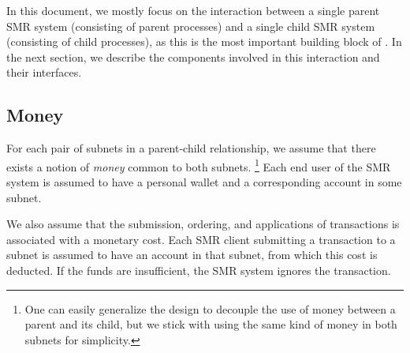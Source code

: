 In this document, we mostly focus on the interaction between a single parent SMR system (consisting of parent processes) and a single child SMR system (consisting of child processes), as this is the most important building block of \ipc.
In the next section, we describe the components involved in this interaction and their interfaces.

\subsection{Money}

For each pair of subnets in a parent-child relationship, we assume that there exists a notion of \emph{money} common to both subnets.%
\footnote{One can easily generalize the design to decouple the use of money between a parent and its child, but we stick with using the same kind of money in both subnets for simplicity.}
Each end user of the SMR system is assumed to have a personal wallet and a corresponding account in some subnet.

We also assume that the submission, ordering, and applications of transactions is associated with a monetary cost.
Each SMR client submitting a transaction to a subnet is assumed to have an account in that subnet, from which this cost is deducted.
If the funds are insufficient, the SMR system ignores the transaction.